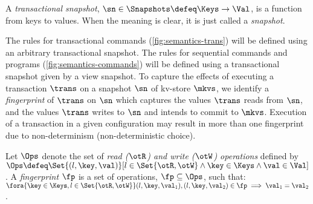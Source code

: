 \SpaceAboveDef
\begin{definition}
\label{def:heaps}
A \emph{transactional snapshot}, \( \sn \in \Snapshots \defeq \Keys \to
\Val\),  is a function from keys to values. When the meaning is clear,
it is just called a {\em snapshot}. 
\end{definition}
\SpaceBelowDef

The rules for transactional commands (\cref{fig:semantics-trans}) will be defined  using an arbitrary 
transactional snapshot. The rules for sequential
commands and programs (\cref{fig:semantics-commands}) will be defined  using a transactional
snapshot given by a view snapshot. 
To capture the effects of executing a transaction \(\trans\) on a snapshot \(\sn\) of kv-store \(\mkvs\), 
we identify a \emph{fingerprint} of \(\trans\) on \(\sn\) which captures
 the values \(\trans\) reads from \(\sn\), and
the values \(\trans\) writes to \(\sn\) and intends to commit to \(\mkvs\). 
Execution of a transaction in a given configuration may result in more than one fingerprint due to non-determinism (non-deterministic choice). 

\SpaceAboveDef
\begin{definition}[Fingerprints]
\label{beebop}
\label{def:fingerprint}
Let \( \Ops\) denote the set of \emph{read (\( \otR\)) and write (\(\otW\)) operations} defined by 
\(\Ops \defeq \Set{(l, \key, \val) }[ l \in \Set{\otR, \otW} \land \key \in \Keys \land \val \in \Val ]\).
A \emph{fingerprint} \(\fp\) is a set of operations, \(\fp \subseteq \Ops\),
such that: 
\(\fora{\key \in \Keys, l  \in \Set{\otR, \otW}}
	(l, \key, \val_1), (l, \key, \val_2) \in \fp \implies \val_1 = \val_2\).
\end{definition}
\SpaceBelowDef


